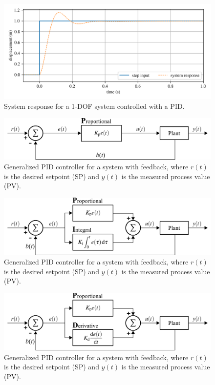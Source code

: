 \documentclass[12pt,letter]{article}
\begin{document}
\begin{figure}[H]
	\centering
	\includegraphics[]{../figures/PID_temporal_response_1.png}
	\caption{System response for a 1-DOF system controlled with a PID.}
	\label{fig:PID_temporal_response_1}
\end{figure}


\begin{figure}[H]
	\centering
	\includegraphics[]{../figures/controller_P.png}
	\caption{Generalized PID controller for a system with feedback, where $r(t)$ is the desired setpoint (SP) and $y(t)$ is the measured process value (PV).}
	\label{fig:P_controller}
\end{figure}


\begin{figure}[H]
	\centering
	\includegraphics[]{../figures/controller_PI.png}
	\caption{Generalized PID controller for a system with feedback, where $r(t)$ is the desired setpoint (SP) and $y(t)$ is the measured process value (PV).}
	\label{fig:PI_controller}
\end{figure}


\begin{figure}[H]
	\centering
	\includegraphics[]{../figures/controller_PD.png}
	\caption{Generalized PID controller for a system with feedback, where $r(t)$ is the desired setpoint (SP) and $y(t)$ is the measured process value (PV).}
	\label{fig:PD_controller}
\end{figure}
\end{document}
